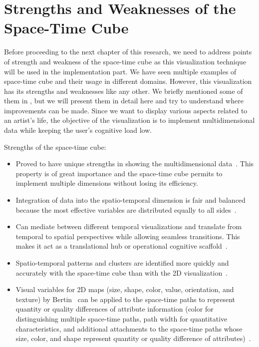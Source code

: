 \section{Strengths and Weaknesses of the Space-Time Cube}\label{sec:strengths-weaknesses-stc}
Before proceeding to the next chapter of this research, we need to address points of strength and weakness of the space-time cube as this
visualization technique will be used in the implementation part. We have seen multiple examples of space-time cube and their usage in
different domains. However, this visualization has its strengths and weaknesses like any other. We briefly mentioned some of them in
, but we will present them in detail here and try to understand where improvements can be made.
Since we want to display various aspects related to an artist’s life, the objective of the visualization is to implement multidimensional data
while keeping the user’s cognitive load low.

Strengths of the space-time cube:
\begin{itemize}
    \item Proved to have unique strengths in showing the multidimensional data~\citep{windhager2016reframing}.
    This property is of great importance and the space-time cube permits to implement multiple dimensions without
    losing its efficiency.
    \item Integration of data into the spatio-temporal dimension is fair and balanced because the most effective variables are distributed
    equally to all sides~\citep{windhager2018orchestrating}.
    \item Can mediate between different temporal visualizations and translate from temporal to spatial perspectives
    while allowing seamless transitions. This makes it act as a translational hub or operational cognitive
    scaffold~\citep{windhager2018orchestrating}.
    \item Spatio-temporal patterns and clusters are identified more quickly and accurately with the space-time cube than with
    the 2D visualization~\citep{amini2014impact, kristensson2008evaluation}.
    \item Visual variables for 2D maps (size, shape, color, value, orientation, and texture) by Bertin~\citep{bertin1983semiology}
    can be applied to the space-time paths to represent quantity or quality differences of attribute information
    (color for distinguishing multiple space-time paths, path width for quantitative characteristics, and additional attachments to the
    space-time paths whose size, color, and shape represent quantity or quality difference of attributes)~\citep{song2021visualization}.
\end{itemize}

